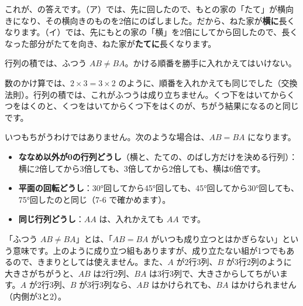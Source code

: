 これが、\bkhatenaref の答えです。（ア）では、先に回したので、もとの家の「たて」が横向きになり、その横向きのものを2倍にのばしました。だから、ねた家が\textbf{横に}長くなります。（イ）では、先にもとの家の「横」を2倍にしてから回したので、長くなった部分がたてを向き、ねた家が\textbf{たてに}長くなります。

\begin{taisetsu}
行列の積では、ふつう $AB\neq BA$。かける順番を勝手に入れかえてはいけない。
\end{taisetsu}

数のかけ算では、$2\times3=3\times2$ のように、順番を入れかえても同じでした（交換法則）。行列の積では、これがふつうは成り立ちません。くつ下をはいてからくつをはくのと、くつをはいてからくつ下をはくのが、ちがう結果になるのと同じです。

いつもちがうわけではありません。次のような場合は、$AB=BA$ になります。
\begin{itemize}[leftmargin=1.2\zw, itemsep=2pt, topsep=2pt, label={\color{\bkTT}●}]
\item \textbf{ななめ以外が0の行列どうし}（横と、たての、のばし方だけを決める行列）：
横に2倍してから3倍しても、3倍してから2倍しても、横は6倍です。
\item \textbf{平面の回転どうし}：30°回してから45°回しても、45°回してから30°回しても、75°回したのと同じ（7-6 で確かめます）。
\item \textbf{同じ行列どうし}：$AA$ は、入れかえても $AA$ です。
\end{itemize}

\begin{seikaku}
「ふつう $AB\neq BA$」とは、「$AB=BA$ がいつも成り立つとはかぎらない」という意味です。上のように成り立つ組もありますが、成り立たない組が1つでもあるので、きまりとしては使えません。また、$A$ が2行3列、$B$ が3行2列のように大きさがちがうと、$AB$ は2行2列、$BA$ は3行3列で、大きさからしてちがいます。$A$ が2行3列、$B$ が3行3列なら、$AB$ はかけられても、$BA$ はかけられません（内側が3と2）。
\end{seikaku}

